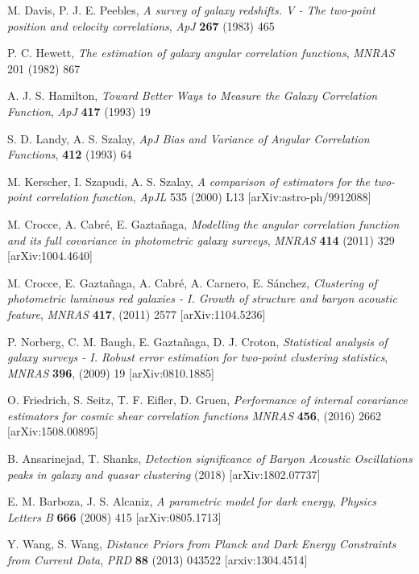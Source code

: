 \documentclass[a4paper,11pt]{article}
\begin{document}
\begin{thebibliography}{99}
M. Davis, P. J. E. Peebles, 
\emph{A survey of galaxy redshifts. V - The two-point position and velocity correlations}, 
\emph{ApJ} 
{\bf 267} 
(1983)
465

P. C. Hewett, 
\emph{The estimation of galaxy angular correlation functions}, 
\emph{MNRAS}
201 
(1982)
867

A. J. S. Hamilton, 
\emph{Toward Better Ways to Measure the Galaxy Correlation Function}, 
\emph{ApJ} 
{\bf 417} 
(1993)
19

S. D. Landy, A. S. Szalay, 
\emph{ApJ} 
\emph{Bias and Variance of Angular Correlation Functions}, 
{\bf 412}
(1993)
64

M. Kerscher, I. Szapudi, A. S. Szalay, 
\emph{A comparison of estimators for the two-point correlation function},
\emph{ApJL} 
535 
(2000)
L13
[arXiv:astro-ph/9912088]

M. Crocce, A. Cabr\'e, E. Gazta\~naga, 
\emph{Modelling the angular correlation function and its full covariance in photometric galaxy surveys},
\emph{MNRAS} 
{\bf 414} 
(2011)
329
[arXiv:1004.4640]

M. Crocce, E. Gazta\~naga, A. Cabr\'e, A. Carnero, E. S\'anchez,  
\emph{Clustering of photometric luminous red galaxies - I. Growth of structure and baryon acoustic 
feature}, 
\emph{MNRAS} 
{\bf 417}, 
(2011)
2577%
[arXiv:1104.5236]

P. Norberg, C. M. Baugh, E. Gazta\~naga, D. J. Croton, 
\emph{Statistical analysis of galaxy surveys - I. Robust error estimation for two-point clustering statistics},
\emph{MNRAS} 
{\bf 396}, 
(2009)
19%
[arXiv:0810.1885]

O. Friedrich, S. Seitz, T. F. Eifler, D. Gruen, 
\emph{Performance of internal covariance estimators for cosmic shear correlation functions}
\emph{MNRAS}
{\bf 456}, 
(2016)
2662%
[arXiv:1508.00895]

B. Ansarinejad, T. Shanks, 
\emph{Detection significance of Baryon Acoustic Oscillations peaks in galaxy and quasar clustering}
(2018)
[arXiv:1802.07737]


E. M. Barboza, J. S.  Alcaniz, 
\emph{A parametric model for dark energy}, 
\emph{Physics Letters B} 
{\bf 666} 
(2008)
415
[arXiv:0805.1713] 

Y. Wang, S. Wang, 
\emph{Distance Priors from Planck and Dark Energy Constraints from Current Data}, 
\emph{PRD} 
{\bf 88} 
(2013)
043522 
[arxiv:1304.4514]


\end{thebibliography}
\end{document}
